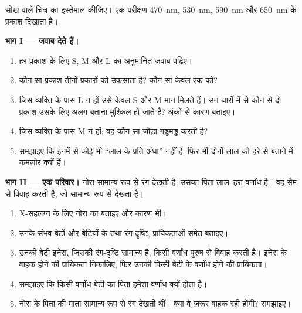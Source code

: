 \begin{problem}
\label{pb:g11:the-eye:1}
सोख वाले चित्र का इस्तेमाल कीजिए। एक परीक्षण \qty{470}{nm},
\qty{530}{nm}, \qty{590}{nm} और \qty{650}{nm} के प्रकाश दिखाता है।

\medskip
\noindent\textbf{भाग I ---  जवाब देते हैं।}
\begin{enumerate}
  \item हर प्रकाश के लिए S, M और L  का अनुमानित जवाब पढ़िए।
  \item कौन-सा प्रकाश तीनों प्रकारों को उकसाता है? कौन-सा केवल एक को?
  \item जिस व्यक्ति के पास L  न हों उसे केवल S और M मान मिलते हैं।
        उन चारों में से कौन-से दो प्रकाश उसके लिए अलग बताना मुश्किल हो
        जाते हैं? अंकों से कारण बताइए।
  \item जिस व्यक्ति के पास M  न हों: वह कौन-सा जोड़ा गड्डमड्ड करती है?
  \item समझाइए कि इनमें से कोई भी ``लाल के प्रति अंधा'' नहीं है, फिर भी
        दोनों लाल को हरे से बताने में कमज़ोर क्यों हैं।
\end{enumerate}

\medskip
\noindent\textbf{भाग II --- एक परिवार।}
नोरा सामान्य रूप से रंग देखती है; उसका पिता लाल--हरा वर्णांध है। वह सैम से
विवाह करती है, जो सामान्य रूप से देखता है।
\begin{enumerate}[resume]
  \item X-सहलग्न   के लिए नोरा का  बताइए और कारण भी।
  \item उनके संभव बेटों और बेटियों के  तथा रंग-दृष्टि,
        प्रायिकताओं समेत बताइए।
  \item उनकी बेटी इनेस, जिसकी रंग-दृष्टि सामान्य है, किसी वर्णांध पुरुष से
        विवाह करती है। इनेस के वाहक होने की प्रायिकता निकालिए, फिर उनकी
        किसी बेटी के वर्णांध होने की प्रायिकता।
  \item समझाइए कि किसी वर्णांध बेटी का पिता हमेशा वर्णांध क्यों होता है।
  \item नोरा के पिता की माता सामान्य रूप से रंग देखती थीं। क्या वे ज़रूर
        वाहक रही होंगी? समझाइए।
\end{enumerate}


\end{problem}
